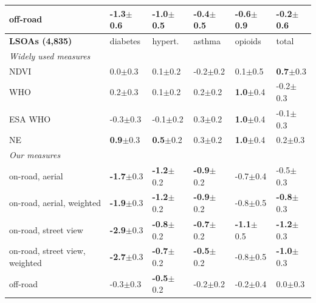 \begin{table}[t!]
\begin{tabular}{l*{5}{l}}
\quad off-road & \cellcolor{negcell}\textbf{-1.3}{\tiny$\pm$0.6} & -1.0{\tiny$\pm$0.5} & -0.4{\tiny$\pm$0.5} & -0.6{\tiny$\pm$0.9} & -0.2{\tiny$\pm$0.6} \\
\midrule[\heavyrulewidth]
\textbf{LSOAs (4,835)} & diabetes & hypert. & asthma & opioids & total \\
\midrule
\multicolumn{6}{l}{\emph{Widely used measures}} \\
\quad NDVI & \phantom{-}0.0{\tiny$\pm$0.3} & \phantom{-}0.1{\tiny$\pm$0.2} & -0.2{\tiny$\pm$0.2} & \phantom{-}0.1{\tiny$\pm$0.5} & \cellcolor{poscell}\textbf{\phantom{-}0.7}{\tiny$\pm$0.3} \\
\quad WHO & \phantom{-}0.2{\tiny$\pm$0.3} & \phantom{-}0.1{\tiny$\pm$0.2} & \phantom{-}0.2{\tiny$\pm$0.2} & \cellcolor{poscell}\textbf{\phantom{-}1.0}{\tiny$\pm$0.4} & -0.2{\tiny$\pm$0.3} \\
\quad ESA WHO & -0.3{\tiny$\pm$0.3} & -0.1{\tiny$\pm$0.2} & \phantom{-}0.3{\tiny$\pm$0.2} & \cellcolor{poscell}\textbf{\phantom{-}1.0}{\tiny$\pm$0.4} & -0.1{\tiny$\pm$0.3} \\
\quad NE & \cellcolor{poscell}\textbf{\phantom{-}0.9}{\tiny$\pm$0.3} & \cellcolor{poscell}\textbf{\phantom{-}0.5}{\tiny$\pm$0.2} & \phantom{-}0.3{\tiny$\pm$0.2} & \cellcolor{poscell}\textbf{\phantom{-}1.0}{\tiny$\pm$0.4} & \phantom{-}0.2{\tiny$\pm$0.3} \\
\midrule
\multicolumn{6}{l}{\emph{Our measures}} \\
\quad on-road, aerial & \cellcolor{negcell}\textbf{-1.7}{\tiny$\pm$0.3} & \cellcolor{negcell}\textbf{-1.2}{\tiny$\pm$0.2} & \cellcolor{negcell}\textbf{-0.9}{\tiny$\pm$0.2} & -0.7{\tiny$\pm$0.4} & -0.5{\tiny$\pm$0.3} \\
\quad on-road, aerial, weighted & \cellcolor{negcell}\textbf{-1.9}{\tiny$\pm$0.3} & \cellcolor{negcell}\textbf{-1.2}{\tiny$\pm$0.2} & \cellcolor{negcell}\textbf{-0.9}{\tiny$\pm$0.2} & -0.8{\tiny$\pm$0.5} & \cellcolor{negcell}\textbf{-0.8}{\tiny$\pm$0.3} \\
\quad on-road, street view & \cellcolor{negcell}\textbf{-2.9}{\tiny$\pm$0.3} & \cellcolor{negcell}\textbf{-0.8}{\tiny$\pm$0.2} & \cellcolor{negcell}\textbf{-0.7}{\tiny$\pm$0.2} & \cellcolor{negcell}\textbf{-1.1}{\tiny$\pm$0.5} & \cellcolor{negcell}\textbf{-1.2}{\tiny$\pm$0.3} \\
\quad on-road, street view, weighted & \cellcolor{negcell}\textbf{-2.7}{\tiny$\pm$0.3} & \cellcolor{negcell}\textbf{-0.7}{\tiny$\pm$0.2} & \cellcolor{negcell}\textbf{-0.5}{\tiny$\pm$0.2} & -0.8{\tiny$\pm$0.5} & \cellcolor{negcell}\textbf{-1.0}{\tiny$\pm$0.3} \\
\quad off-road & -0.3{\tiny$\pm$0.3} & \cellcolor{negcell}\textbf{-0.5}{\tiny$\pm$0.2} & -0.2{\tiny$\pm$0.2} & -0.2{\tiny$\pm$0.4} & \phantom{-}0.0{\tiny$\pm$0.3} \\
\bottomrule
\end{tabular}
\end{table}
